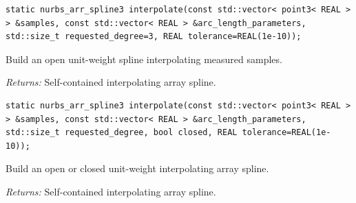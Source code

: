 \par\noindent\begin{minipage}{\linewidth}
\begin{lstlisting}[style=apireference]
static nurbs_arr_spline3 interpolate(const std::vector< point3< REAL > > &samples, const std::vector< REAL > &arc_length_parameters, std::size_t requested_degree=3, REAL tolerance=REAL(1e-10));
\end{lstlisting}
{\footnotesize Build an open unit-weight spline interpolating measured samples.\par}
{\footnotesize\textit{Returns:} Self-contained interpolating array spline.\par}
\end{minipage}\par\vspace{1pt}
\par\noindent\begin{minipage}{\linewidth}
\begin{lstlisting}[style=apireference]
static nurbs_arr_spline3 interpolate(const std::vector< point3< REAL > > &samples, const std::vector< REAL > &arc_length_parameters, std::size_t requested_degree, bool closed, REAL tolerance=REAL(1e-10));
\end{lstlisting}
{\footnotesize Build an open or closed unit-weight interpolating array spline.\par}
{\footnotesize\textit{Returns:} Self-contained interpolating array spline.\par}
\end{minipage}\par\vspace{1pt}
